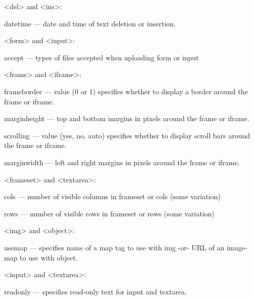 \begin{compactitem}
\item <del> and <ins>:
	
	\begin{compactitem}
	\item datetime — date and time of text deletion or insertion.
	\end{compactitem}
	
\item <form> and <input>:
	
	\begin{compactitem}
	\item accept — types of files accepted when uploading form or input
	\end{compactitem}
	
\item <frame> and <iframe>:
	
	\begin{compactitem}
	\item frameborder — value (0 or 1) specifies whether to display a border around the frame or iframe.
	\item marginheight — top and bottom margins in pixels around the frame or iframe.
	\item scrolling — value (yes, no, auto) specifies whether to display scroll bars around the frame or iframe.
	\item marginwidth — left and right margins in pixels around the frame or iframe.
	\end{compactitem}
	
\item <frameset> and <textarea>:
	
	\begin{compactitem}
	\item cols — number of visible columns in frameset or cols (some variation)
	\item rows — number of visible rows in frameset or rows (some variation)
	\end{compactitem}
	
\item <img> and <object>:
	
	\begin{compactitem}
	\item usemap — specifies name of a map tag to use with img -or- URL of an image-map to use with object.
	\end{compactitem}
	
\item <input> and <textarea>:

	\begin{compactitem}
	\item readonly — specifies read-only text for input and textarea.
	\end{compactitem}
	

\end{compactitem}
